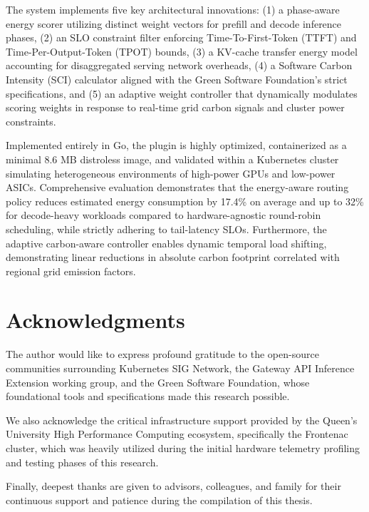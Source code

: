 \documentclass[12pt,a4paper,oneside]{report}
\begin{document}
The system implements five key architectural innovations: (1) a phase-aware energy scorer utilizing distinct weight vectors for prefill and decode inference phases, (2) an SLO constraint filter enforcing Time-To-First-Token (TTFT) and Time-Per-Output-Token (TPOT) bounds, (3) a KV-cache transfer energy model accounting for disaggregated serving network overheads, (4) a Software Carbon Intensity (SCI) calculator aligned with the Green Software Foundation's strict specifications, and (5) an adaptive weight controller that dynamically modulates scoring weights in response to real-time grid carbon signals and cluster power constraints.

Implemented entirely in Go, the plugin is highly optimized, containerized as a minimal 8.6 MB distroless image, and validated within a Kubernetes cluster simulating heterogeneous environments of high-power GPUs and low-power ASICs. Comprehensive evaluation demonstrates that the energy-aware routing policy reduces estimated energy consumption by 17.4\% on average and up to 32\% for decode-heavy workloads compared to hardware-agnostic round-robin scheduling, while strictly adhering to tail-latency SLOs. Furthermore, the adaptive carbon-aware controller enables dynamic temporal load shifting, demonstrating linear reductions in absolute carbon footprint correlated with regional grid emission factors.


\chapter*{Acknowledgments}
The author would like to express profound gratitude to the open-source communities surrounding Kubernetes SIG Network, the Gateway API Inference Extension working group, and the Green Software Foundation, whose foundational tools and specifications made this research possible. 

We also acknowledge the critical infrastructure support provided by the Queen's University High Performance Computing ecosystem, specifically the Frontenac cluster, which was heavily utilized during the initial hardware telemetry profiling and testing phases of this research.

Finally, deepest thanks are given to advisors, colleagues, and family for their continuous support and patience during the compilation of this thesis.
\end{document}
